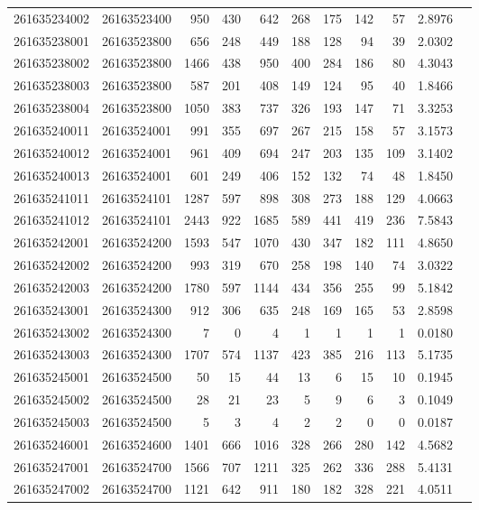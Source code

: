 \documentclass[11pt,landscape]{article}
\begin{document}
{\begin{longtable}[]{@{}lrrrrrrrrrr@{}}
261635234002 & 26163523400 & 950 & 430 & 642 & 268 & 175 & 142 & 57 & 2.8976 \\
261635238001 & 26163523800 & 656 & 248 & 449 & 188 & 128 & 94 & 39 & 2.0302 \\
261635238002 & 26163523800 & 1466 & 438 & 950 & 400 & 284 & 186 & 80 & 4.3043 \\
261635238003 & 26163523800 & 587 & 201 & 408 & 149 & 124 & 95 & 40 & 1.8466 \\
261635238004 & 26163523800 & 1050 & 383 & 737 & 326 & 193 & 147 & 71 & 3.3253 \\
261635240011 & 26163524001 & 991 & 355 & 697 & 267 & 215 & 158 & 57 & 3.1573 \\
261635240012 & 26163524001 & 961 & 409 & 694 & 247 & 203 & 135 & 109 & 3.1402 \\
261635240013 & 26163524001 & 601 & 249 & 406 & 152 & 132 & 74 & 48 & 1.8450 \\
261635241011 & 26163524101 & 1287 & 597 & 898 & 308 & 273 & 188 & 129 & 4.0663 \\
261635241012 & 26163524101 & 2443 & 922 & 1685 & 589 & 441 & 419 & 236 & 7.5843 \\
261635242001 & 26163524200 & 1593 & 547 & 1070 & 430 & 347 & 182 & 111 & 4.8650 \\
261635242002 & 26163524200 & 993 & 319 & 670 & 258 & 198 & 140 & 74 & 3.0322 \\
261635242003 & 26163524200 & 1780 & 597 & 1144 & 434 & 356 & 255 & 99 & 5.1842 \\
261635243001 & 26163524300 & 912 & 306 & 635 & 248 & 169 & 165 & 53 & 2.8598 \\
261635243002 & 26163524300 & 7 & 0 & 4 & 1 & 1 & 1 & 1 & 0.0180 \\
261635243003 & 26163524300 & 1707 & 574 & 1137 & 423 & 385 & 216 & 113 & 5.1735 \\
261635245001 & 26163524500 & 50 & 15 & 44 & 13 & 6 & 15 & 10 & 0.1945 \\
261635245002 & 26163524500 & 28 & 21 & 23 & 5 & 9 & 6 & 3 & 0.1049 \\
261635245003 & 26163524500 & 5 & 3 & 4 & 2 & 2 & 0 & 0 & 0.0187 \\
261635246001 & 26163524600 & 1401 & 666 & 1016 & 328 & 266 & 280 & 142 & 4.5682 \\
261635247001 & 26163524700 & 1566 & 707 & 1211 & 325 & 262 & 336 & 288 & 5.4131 \\
261635247002 & 26163524700 & 1121 & 642 & 911 & 180 & 182 & 328 & 221 & 4.0511 \\

\end{longtable}}
\end{document}
